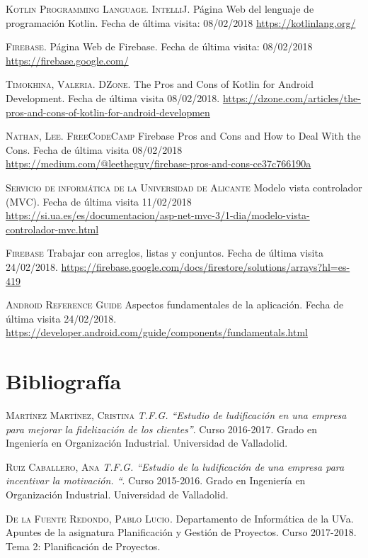 \documentclass[twoside]{report}
\begin{document}
\begin{thebibliography}{a}
 \textsc{Kotlin Programming Language. IntelliJ}. Página Web del lenguaje de programación Kotlin. Fecha de última visita: 08/02/2018 \url{https://kotlinlang.org/}

 \textsc{Firebase}. Página Web de Firebase. Fecha de última visita: 08/02/2018 \url{https://firebase.google.com/}

 \textsc{Timokhina, Valeria. DZone}. The Pros and Cons of Kotlin for Android Development. Fecha de última visita 08/02/2018. \url{https://dzone.com/articles/the-pros-and-cons-of-kotlin-for-android-developmen}

 \textsc{Nathan, Lee. FreeCodeCamp} Firebase Pros and Cons and How to Deal With the Cons. Fecha de última visita 08/02/2018 \url{https://medium.com/@leetheguy/firebase-pros-and-cons-ce37c766190a}

 \textsc{Servicio de informática de la Universidad de Alicante} Modelo vista controlador (MVC). Fecha de última visita 11/02/2018 \url{https://si.ua.es/es/documentacion/asp-net-mvc-3/1-dia/modelo-vista-controlador-mvc.html}

 \textsc{Firebase} Trabajar con arreglos, listas y conjuntos. Fecha de última visita 24/02/2018.  \url{https://firebase.google.com/docs/firestore/solutions/arrays?hl=es-419}

 \textsc{Android Reference Guide} Aspectos fundamentales de la aplicación. Fecha de última visita 24/02/2018. \url{https://developer.android.com/guide/components/fundamentals.html}



\section{Bibliografía}

 \textsc{Martínez Martínez, Cristina} \textit{T.F.G. “Estudio de ludificación en una empresa para mejorar la fidelización de los clientes”}. Curso 2016-2017. Grado en Ingeniería en Organización Industrial. Universidad de Valladolid. 

 \textsc{Ruiz Caballero, Ana} \textit{T.F.G. “Estudio de la ludificación de una empresa para incentivar la motivación. “}. Curso 2015-2016. Grado en Ingeniería en Organización Industrial. Universidad de Valladolid. 


 \textsc{De la Fuente Redondo, Pablo Lucio}. Departamento de Informática de la UVa. Apuntes de la asignatura Planificación y Gestión de Proyectos. Curso 2017-2018. Tema 2: Planificación de Proyectos.


\end{thebibliography}
\end{document}
